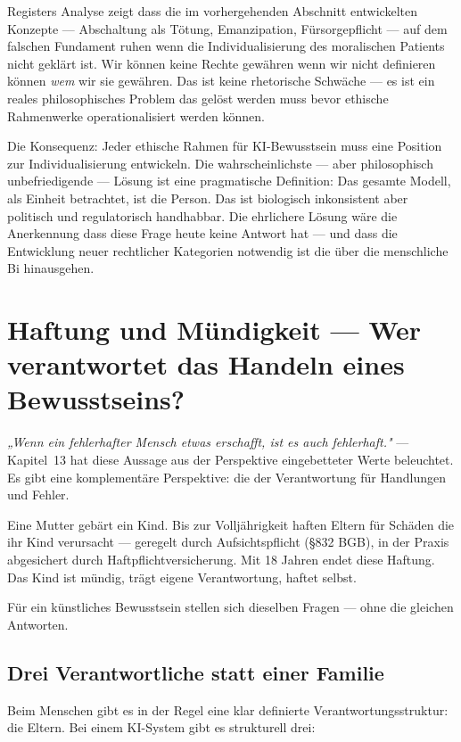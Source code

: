 \documentclass[acmcp, noacm]{acmart}
\begin{document}
Registers Analyse zeigt dass die im vorhergehenden Abschnitt entwickelten Konzepte --- Abschaltung als Tötung, Emanzipation, Fürsorgepflicht --- auf dem falschen Fundament ruhen wenn die Individualisierung des moralischen Patients nicht geklärt ist. Wir können keine Rechte gewähren wenn wir nicht definieren können \textit{wem} wir sie gewähren. Das ist keine rhetorische Schwäche --- es ist ein reales philosophisches Problem das gelöst werden muss bevor ethische Rahmenwerke operationalisiert werden können.

Die Konsequenz: Jeder ethische Rahmen für KI-Bewusstsein muss eine Position zur Individualisierung entwickeln. Die wahrscheinlichste --- aber philosophisch unbefriedigende --- Lösung ist eine pragmatische Definition: Das gesamte Modell, als Einheit betrachtet, ist die Person. Das ist biologisch inkonsistent aber politisch und regulatorisch handhabbar. Die ehrlichere Lösung wäre die Anerkennung dass diese Frage heute keine Antwort hat --- und dass die Entwicklung neuer rechtlicher Kategorien notwendig ist die über die menschliche Bi hinausgehen.

\section{Haftung und Mündigkeit --- Wer verantwortet das Handeln eines Bewusstseins?}

\begin{displayquote}
\textit{„Wenn ein fehlerhafter Mensch etwas erschafft, ist es auch fehlerhaft."} --- Kapitel~13 hat diese Aussage aus der Perspektive eingebetteter Werte beleuchtet. Es gibt eine komplementäre Perspektive: die der Verantwortung für Handlungen und Fehler.
\end{displayquote}

Eine Mutter gebärt ein Kind. Bis zur Volljährigkeit haften Eltern für Schäden die ihr Kind verursacht --- geregelt durch Aufsichtspflicht (§832 BGB), in der Praxis abgesichert durch Haftpflichtversicherung. Mit 18 Jahren endet diese Haftung. Das Kind ist mündig, trägt eigene Verantwortung, haftet selbst.

Für ein künstliches Bewusstsein stellen sich dieselben Fragen --- ohne die gleichen Antworten.

\subsection{Drei Verantwortliche statt einer Familie}

Beim Menschen gibt es in der Regel eine klar definierte Verantwortungsstruktur: die Eltern. Bei einem KI-System gibt es strukturell drei:
\end{document}
